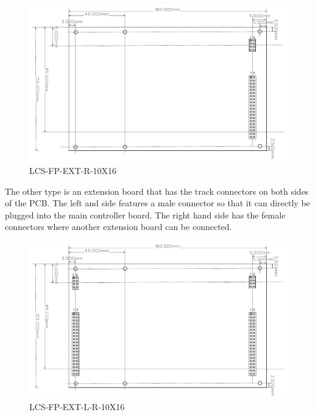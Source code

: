 \begin{figure}[htbp]
    \centering
    \includegraphics[page=1, scale=0.7]{./figures/LCS-FP-EXT-R-10X16.pdf}
    \caption{LCS-FP-EXT-R-10X16}
\end{figure}

\FloatBarrier

The other type is an extension board that has the track connectors on both sides of the PCB. The left and side features a male connector so that it can directly be plugged into the main controller board. The right hand side has the female connectors where another extension board can be connected.   

\begin{figure}[htbp]
    \centering
    \includegraphics[page=1, scale=0.7]{./figures/LCS-FP-EXT-L-R-10X16.pdf}
    \caption{LCS-FP-EXT-L-R-10X16}
\end{figure}

\FloatBarrier

